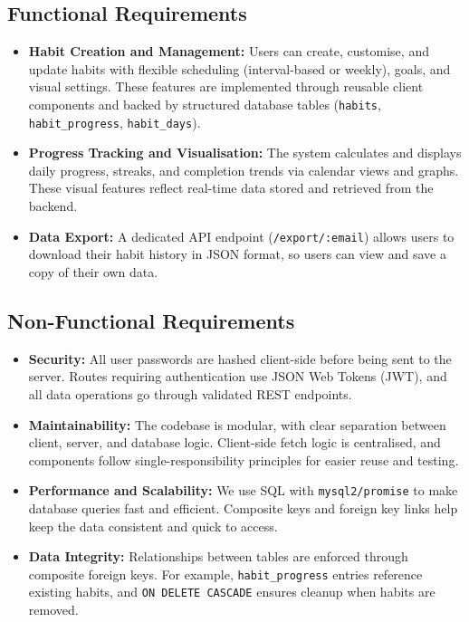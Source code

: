 \subsection{Functional Requirements}

\begin{itemize}
  \item \textbf{Habit Creation and Management:} Users can create, customise, and update habits with flexible scheduling (interval-based or weekly), goals, and visual settings. These features are implemented through reusable client components and backed by structured database tables (\texttt{habits}, \texttt{habit\_progress}, \texttt{habit\_days}).

  \item \textbf{Progress Tracking and Visualisation:} The system calculates and displays daily progress, streaks, and completion trends via calendar views and graphs. These visual features reflect real-time data stored and retrieved from the backend.

  \item \textbf{Data Export:} A dedicated API endpoint (\texttt{/export/:email}) allows users to download their habit history in JSON format, so users can view and save a copy of their own data.
\end{itemize}

\subsection{Non-Functional Requirements}


\begin{itemize}
  \item \textbf{Security:} All user passwords are hashed client-side before being sent to the server. Routes requiring authentication use JSON Web Tokens (JWT), and all data operations go through validated REST endpoints.

  \item \textbf{Maintainability:} The codebase is modular, with clear separation between client, server, and database logic. Client-side fetch logic is centralised, and components follow single-responsibility principles for easier reuse and testing.

  \item \textbf{Performance and Scalability:} We use SQL with \texttt{mysql2/promise} to make database queries fast and efficient. Composite keys and foreign key links help keep the data consistent and quick to access.

  \item \textbf{Data Integrity:} Relationships between tables are enforced through composite foreign keys. For example, \texttt{habit\_progress} entries reference existing habits, and \texttt{ON DELETE CASCADE} ensures cleanup when habits are removed.
\end{itemize}


